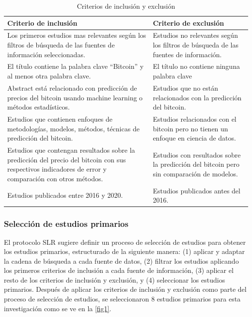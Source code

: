 \begin{table}[h!]
	\centering
	\begin{tabular}{ | m{7cm}| m{7cm} | }
		\hline
		\textbf{Criterio de inclusión} & \textbf{Criterio de exclusión}\\
		\hline
		
		Los primeros estudios mas relevantes según los filtros de búsqueda de las fuentes de información seleccionadas.& Estudios no relevantes según los filtros de búsqueda de las fuentes de información.\\
		
		\hline
		El título contiene la palabra clave ``Bitcoin'' y al menos otra palabra clave. &  El título no contiene ninguna palabra clave\\ 
		\hline
		Abstract está relacionado con predicción de precios del bitcoin usando machine learning o métodos estadísticos. & Estudios que no están relacionados con la predicción del
		bitcoin.\\
		\hline
		Estudios que contienen enfoques de metodologías, modelos, métodos, técnicas de predicción del bitcoin. & Estudios relacionados con el bitcoin pero no tienen un
		enfoque en ciencia de datos.\\
		\hline
		Estudios que contengan resultados sobre la predicción del precio del bitcoin con sus respectivos indicadores de error y comparación con otros métodos. & Estudios con resultados sobre la predicción del bitcoin pero sin comparación de modelos.\\
		\hline
		Estudios publicados entre 2016 y 2020. & Estudios publicados antes del 2016.\\
		\hline
	\end{tabular}
	\caption{Criterios de inclusión y exclusión}
	\label{tab:Table1}
\end{table}

\subsubsection{Selección de estudios primarios}
El protocolo SLR \cite{kitchenhamSystematicLiteratureReviews2009} sugiere definir un proceso de selección de estudios para obtener los estudios primarios, estructurado de la siguiente manera: (1) aplicar y adaptar la cadena de búsqueda a cada fuente de datos, (2) filtrar los estudios aplicando los primeros criterios de inclusión a cada fuente de información, (3) aplicar el resto de los criterios de inclusión y exclusión, y (4) seleccionar los estudios primarios. Después de aplicar los criterios de inclusión y exclusión como parte del proceso de selección de estudios, se seleccionaron 8 estudios primarios para esta investigación como se ve en la \autoref{fig1}.\\

